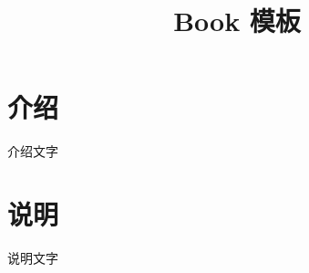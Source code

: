 \documentclass[10pt,fontset=adobe,UTF8]{ctexbook}
\title{Book 模板}
\begin{document}
\frontmatter
\maketitle

\tableofcontents
    
\mainmatter

\chapter{介绍}

介绍文字

\chapter{说明}

说明文字
\end{document}
